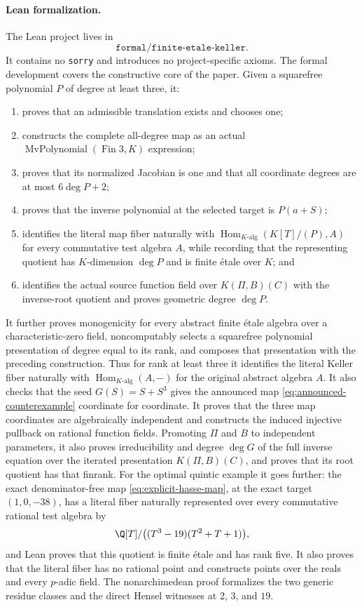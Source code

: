 \paragraph{Lean formalization.}
The Lean project lives in
\[
 \texttt{formal/finite-etale-keller}.
\]
It contains no \texttt{sorry} and introduces no project-specific axioms.  The
formal development covers the constructive core of the paper.  Given a
squarefree polynomial $P$ of degree at least three, it:
\begin{enumerate}
\item proves that an admissible translation exists and chooses one;
\item constructs the complete all-degree map as an actual
      $\operatorname{MvPolynomial}(\operatorname{Fin}3,K)$ expression;
\item proves that its normalized Jacobian is one and that all coordinate
      degrees are at most $6\deg P+2$;
\item proves that the inverse polynomial at the selected target is
      $P(a+S)$;
\item identifies the literal map fiber naturally with
      $\operatorname{Hom}_{K\text{-alg}}(K[T]/(P),A)$ for every commutative
      test algebra $A$, while recording that the representing quotient has
      $K$-dimension $\deg P$ and is finite \'etale over $K$; and
\item identifies the actual source function field over $K(\Pi,B)(C)$ with
      the inverse-root quotient and proves geometric degree $\deg P$.
\end{enumerate}
It further proves monogenicity for every abstract finite \'etale algebra over
a characteristic-zero field, noncomputably selects a squarefree polynomial
presentation of degree equal to its rank, and composes that presentation with
the preceding construction.  Thus for rank at least three it identifies the
literal Keller fiber naturally with
\(\operatorname{Hom}_{K\text{-alg}}(A,-)\) for the original abstract algebra
\(A\).
It also checks that the seed $G(S)=S+S^3$ gives the announced map
\eqref{eq:announced-counterexample} coordinate for coordinate.  It proves
that the three map coordinates are algebraically independent and constructs
the induced injective pullback on rational function fields.  Promoting $\Pi$
and $B$ to independent parameters, it also proves irreducibility and degree
$\deg G$ of the full inverse equation over the iterated presentation
$K(\Pi,B)(C)$, and proves that its root quotient has that finrank.  For the
optimal quintic example it goes further: the exact denominator-free map
\eqref{eq:explicit-hasse-map}, at the exact target $(1,0,-38)$, has a literal
fiber naturally represented over every commutative rational test algebra by
\[
 \Q[T]/\bigl((T^3-19)(T^2+T+1)\bigr),
\]
and Lean proves that this quotient is finite \'etale and has rank five.
It also proves that the literal fiber has no rational point and constructs
points over the reals and every $p$-adic field.  The nonarchimedean proof
formalizes the two generic residue classes and the direct Hensel witnesses at
$2$, $3$, and $19$.

